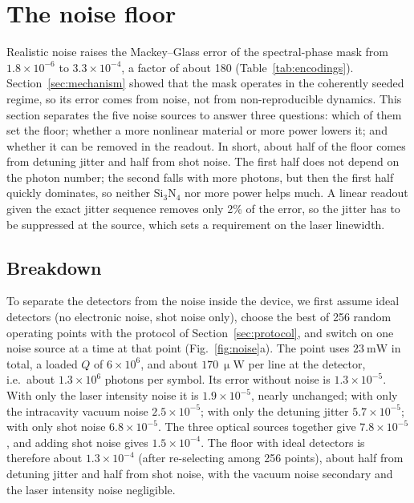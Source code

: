 \section{The noise floor}\label{sec:noise}

Realistic noise raises the Mackey--Glass error of the spectral-phase mask from $1.8\times10^{-6}$ to $3.3\times10^{-4}$, a factor of
about 180 (Table~\ref{tab:encodings}). Section~\ref{sec:mechanism} showed that the mask operates in the coherently seeded regime, so
its error comes from noise, not from non-reproducible dynamics. This section separates the five noise sources to answer three
questions: which of them set the floor; whether a more nonlinear material or more power lowers it; and whether it can be removed
in the readout. In short, about half of the floor comes from detuning jitter and half from shot noise. The first half does not
depend on the photon number; the second falls with more photons, but then the first half quickly dominates, so neither
Si$_3$N$_4$ nor more power helps much. A linear readout given the exact jitter sequence removes only 2\% of the error, so the jitter
has to be suppressed at the source, which sets a requirement on the laser linewidth.

\subsection{Breakdown}\label{sec:breakdown}

To separate the detectors from the noise inside the device, we first assume ideal detectors (no electronic noise, shot noise only),
choose the best of 256 random operating points with the protocol of Section~\ref{sec:protocol}, and switch on one noise source at a
time at that point (Fig.~\ref{fig:noise}a). The point uses $23~\mathrm{mW}$ in total, a loaded $Q$ of $6\times10^{6}$, and about
$170~\upmu\mathrm{W}$ per line at the detector, i.e.\ about $1.3\times10^{6}$ photons per symbol.
Its error without noise is $1.3\times10^{-5}$. With only the laser intensity noise it is $1.9\times10^{-5}$, nearly unchanged; with
only the intracavity vacuum noise $2.5\times10^{-5}$; with only the detuning jitter $5.7\times10^{-5}$; with only shot noise
$6.8\times10^{-5}$. The three optical sources together give $7.8\times10^{-5}$, and adding shot noise gives $1.5\times10^{-4}$.
The floor with ideal detectors is therefore about $1.3\times10^{-4}$ (after re-selecting among 256 points), about half from
detuning jitter and half from shot noise, with the vacuum noise secondary and the laser intensity noise negligible.

